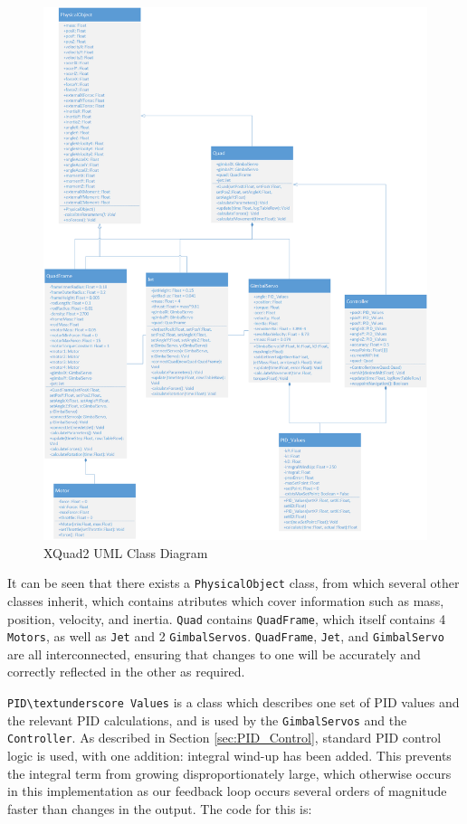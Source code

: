 \documentclass[11pt]{article}
\begin{document}
\begin{figure}
    \includegraphics[width=\linewidth]{XQuad_2_Class_Diagram}
    \caption{XQuad2 UML Class Diagram}
    \label{fig:XQuad_2_Class_Diagram}
\end{figure}

It can be seen that there exists a \lstinline|PhysicalObject| class, from which several other classes inherit, which contains atributes which cover information such as mass, position, velocity, and inertia. \lstinline|Quad| contains \lstinline|QuadFrame|, which itself contains 4 \lstinline|Motors|, as well as \lstinline|Jet| and 2 \lstinline|GimbalServos|. \lstinline|QuadFrame|, \lstinline|Jet|, and \lstinline|GimbalServo| are all interconnected, ensuring that changes to one will be accurately and correctly reflected in the other as required.

\lstinline|PID\textunderscore Values| is a class which describes one set of PID values and the relevant PID calculations, and is used by the \lstinline|GimbalServos| and the \lstinline|Controller|. As described in Section \ref{sec:PID_Control}, standard PID control logic is used, with one addition: integral wind-up has been added. This prevents the integral term from growing disproportionately large, which otherwise occurs in this implementation as our feedback loop occurs several orders of magnitude faster than changes in the output. The code for this is:
\end{document}
